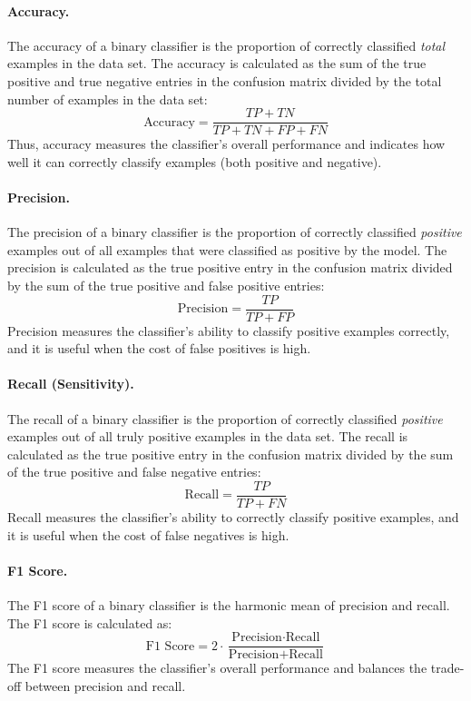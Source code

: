 \documentclass{article}[11pt]
\begin{document}
\paragraph*{Accuracy.}
The accuracy of a binary classifier is the proportion of correctly classified \textit{total} examples in the data set.
The accuracy is calculated as the sum of the true positive and true negative entries in the confusion matrix divided by the total number of examples in the data set:
\begin{equation}
    \text{Accuracy} = \frac{TP + TN}{TP + TN + FP + FN}
\end{equation}
Thus, accuracy measures the classifier's overall performance and indicates how well it can correctly classify examples (both positive and negative).

\paragraph*{Precision.}
The precision of a binary classifier is the proportion of correctly classified \textit{positive} examples out of all examples that were classified as positive by the model.
The precision is calculated as the true positive entry in the confusion matrix divided by the sum of the true positive and false positive entries:
\begin{equation}
    \text{Precision} = \frac{TP}{TP + FP}
\end{equation}
Precision measures the classifier's ability to classify positive examples correctly, and it is useful when the cost of false positives is high.

\paragraph*{Recall (Sensitivity).}
The recall of a binary classifier is the proportion of correctly classified \textit{positive} examples out of all truly positive examples in the data set.
The recall is calculated as the true positive entry in the confusion matrix divided by the sum of the true positive and false negative entries:
\begin{equation}
    \text{Recall} = \frac{TP}{TP + FN}
\end{equation}
Recall measures the classifier's ability to correctly classify positive examples, and it is useful when the cost of false negatives is high.

\paragraph*{F1 Score.}
The F1 score of a binary classifier is the harmonic mean of precision and recall. The F1 score is calculated as:
\begin{equation}
    \text{F1 Score} = 2\cdot\frac{\text{Precision}\cdot\text{Recall}}{\text{Precision} + \text{Recall}}
\end{equation}
The F1 score measures the classifier's overall performance and balances the trade-off between precision and recall.
\end{document}
